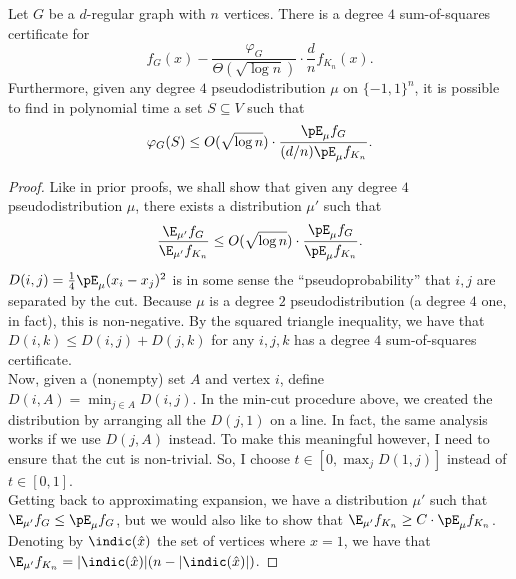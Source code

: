 	\begin{ftheo}
		Let $G$ be a $d$-regular graph with $n$ vertices. There is a degree $4$ sum-of-squares certificate for
		\[ f_G(x) - \frac{\varphi_G}{\Theta(\sqrt{\log n})} \cdot \frac{d}{n} f_{K_n}(x). \]
		Furthermore, given any degree $4$ pseudodistribution $\mu$ on $\{-1,1\}^n$, it is possible to find in polynomial time a set $S \subseteq V$ such that
		\[ \varphi_G(S) \le O(\sqrt{\log n}) \cdot \frac{\pE_\mu f_G}{(d/n) \pE_\mu f_{K_n}}. \]
	\end{ftheo}
	\begin{proof}
		Like in prior proofs, we shall show that given any degree $4$ pseudodistribution $\mu$, there exists a distribution $\mu'$ such that
		\[ \frac{\E_{\mu'} f_G}{\E_{\mu'} f_{K_n}} \le O(\sqrt{\log n}) \cdot \frac{\pE_\mu f_G}{\pE_\mu f_{K_n}}. \]
		$D(i,j) = \frac{1}{4} \pE_\mu (x_i - x_j)^2$ is in some sense the ``pseudoprobability'' that $i,j$ are separated by the cut. Because $\mu$ is a degree $2$ pseudodistribution (a degree $4$ one, in fact), this is non-negative. By the squared triangle inequality, we have that $D(i,k) \le D(i,j) + D(j,k)$ for any $i,j,k$ has a degree $4$ sum-of-squares certificate. \\
		Now, given a (nonempty) set $A$ and vertex $i$, define $D(i,A) = \min_{j \in A} D(i,j)$. In the min-cut procedure above, we created the distribution by arranging all the $D(j,1)$ on a line. In fact, the same analysis works if we use $D(j,A)$ instead. To make this meaningful however, I need to ensure that the cut is non-trivial. So, I choose $t \in [0,\max_j D(1,j)]$ instead of $t \in [0,1]$.\\
		Getting back to approximating expansion, we have a distribution $\mu'$ such that $\E_{\mu'} f_G \le \pE_{\mu} f_G$, but we would also like to show that $\E_{\mu'} f_{K_n} \ge C \cdot \pE_\mu f_{K_n}$. Denoting by $\indic(\hat{x})$ the set of vertices where $\hat{x} = 1$, we have that $\E_{\mu'} f_{K_n} = |\indic(\hat{x})|(n - |\indic(\hat{x})|)$.

	\end{proof}
	

